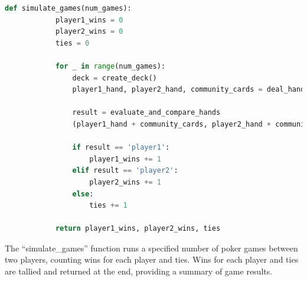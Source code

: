 \documentclass{article}
\begin{document}
\begin{center}
    \begin{lstlisting}[language=Python]
        def simulate_games(num_games):
            player1_wins = 0
            player2_wins = 0
            ties = 0
            
            for _ in range(num_games):
                deck = create_deck()
                player1_hand, player2_hand, community_cards = deal_hands(deck)
                
                result = evaluate_and_compare_hands
                (player1_hand + community_cards, player2_hand + community_cards)
                
                if result == 'player1':
                    player1_wins += 1
                elif result == 'player2':
                    player2_wins += 1
                else:
                    ties += 1
            
            return player1_wins, player2_wins, ties
    \end{lstlisting}
\end{center}

The ``simulate\_games'' function runs a specified number of poker 
games between two players, counting wins for each player and ties.
Wins 
for each player and ties are tallied and returned at the end, 
providing a summary of game results.
\end{document}
